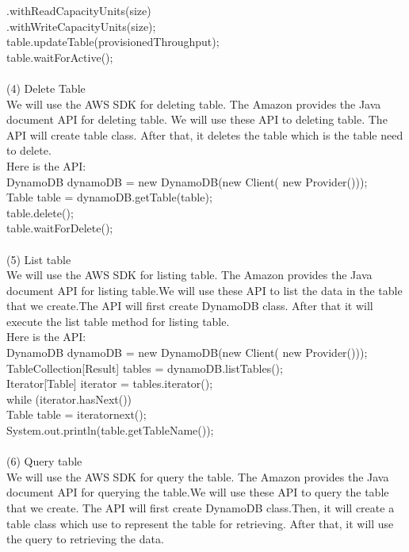     .withReadCapacityUnits(size)\\
    .withWriteCapacityUnits(size);\\
    table.updateTable(provisionedThroughput);\\
    table.waitForActive();\\
\\
    (4) Delete Table\\
    We will use the AWS SDK for deleting table. The Amazon provides the Java document API for deleting table. We will use these API to deleting table. The API will create table class. After that, it deletes the table which is the table need to delete.\\
    Here is the API\cite{w1}:\\
    DynamoDB dynamoDB = new DynamoDB(new Client(
    new Provider()));\\
    Table table = dynamoDB.getTable(table);\\
    table.delete();\\
    table.waitForDelete();\\
\\
    (5) List table\\
    We will use the AWS SDK for listing table. The Amazon provides the Java document API for listing table.We will use these API to list the data in the table that we create.The API will first create DynamoDB class. After that it will execute the list table method for listing table.\\
    Here is the API\cite{w1}:\\
    DynamoDB dynamoDB = new DynamoDB(new Client(
       new Provider()));\\
    TableCollection[Result] tables = dynamoDB.listTables();\\
    Iterator[Table] iterator = tables.iterator();\\
    while (iterator.hasNext()) \\
    Table table = iteratornext();\\
    System.out.println(table.getTableName());\\
\\
    (6) Query table \\
    We will use the AWS SDK for query the table. The Amazon provides the Java document API for querying the table.We will use these API to query the table that we create. The API will first create DynamoDB class.Then, it will create a table class which use to represent the table for retrieving. After that, it will use the query to retrieving the data.\\
